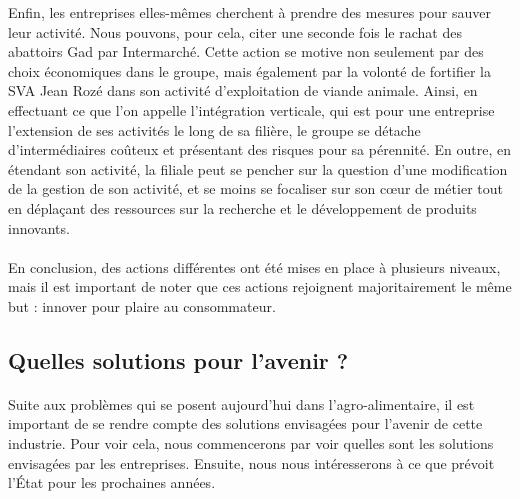 \documentclass[a4paper,12pt]{report}
\begin{document}
			Enfin, les entreprises elles-mêmes cherchent à prendre des mesures pour sauver leur activité. Nous pouvons, pour cela, citer une seconde fois le rachat des abattoirs Gad par Intermarché. Cette action se motive non seulement par des choix économiques dans le groupe, mais également par la volonté de fortifier la SVA Jean Rozé dans son activité d’exploitation de viande animale. Ainsi, en effectuant ce que l’on appelle l’intégration verticale, qui est pour une entreprise l’extension de ses activités le long de sa filière, le groupe se détache d’intermédiaires coûteux et présentant des risques pour sa pérennité. En outre, en étendant son activité, la filiale peut se pencher sur la question d’une modification de la gestion de son activité, et se moins se focaliser sur son cœur de métier tout en déplaçant des ressources sur la recherche et le développement de produits innovants.

			\paragraph{}En conclusion, des actions différentes ont été mises en place à plusieurs niveaux, mais il est important de noter que ces actions rejoignent majoritairement le même but : innover pour plaire au consommateur.

			
		\subsection{Quelles solutions pour l'avenir ?}
			\paragraph{}Suite aux problèmes qui se posent aujourd'hui dans l’agro-alimentaire, il est important de se rendre compte des solutions envisagées pour l’avenir de cette industrie. Pour voir cela, nous commencerons par voir quelles sont les solutions envisagées par les entreprises. Ensuite, nous nous intéresserons à ce que prévoit l’État pour les prochaines années.
			
\end{document}
